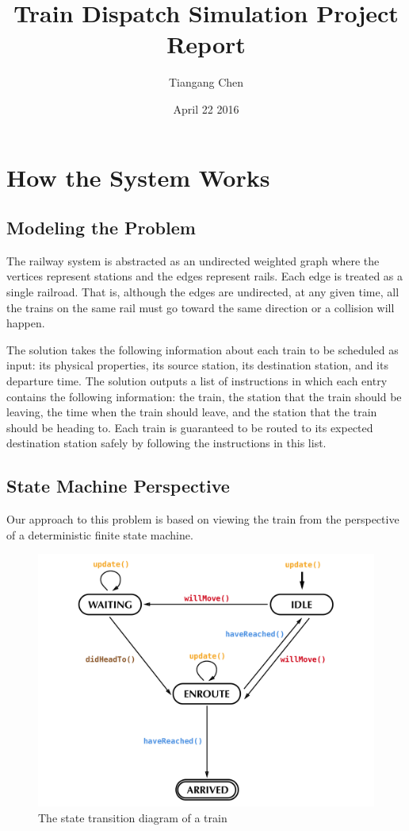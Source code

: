\documentclass[letterpaper, 12pt]{article}
\title{Train Dispatch Simulation Project Report}
\author{Tiangang Chen}
\date{April 22 2016}
\begin{document}
\maketitle
\tableofcontents
\clearpage

\section{How the System Works}
\subsection{Modeling the Problem}
The railway system is abstracted as an undirected weighted graph where the vertices represent stations and the edges represent rails. Each edge is treated as a single railroad. That is, although the edges are undirected, at any given time, all the trains on the same rail must go toward the same direction or a collision will happen.

The solution takes the following information about each train to be scheduled as input: its physical properties, its source station, its destination station, and its departure time. The solution outputs a list of instructions in which each entry contains the following information: the train, the station that the train should be leaving, the time when the train should leave, and the station that the train should be heading to. Each train is guaranteed to be routed to its expected destination station safely by following the instructions in this list.

\subsection{State Machine Perspective}
Our approach to this problem is based on viewing the train from the perspective of a deterministic finite state machine.

\begin{figure}[h]
\centering
\includegraphics[width=\textwidth]{Train-States}
\caption{The state transition diagram of a train}
\end{figure}
\end{document}
